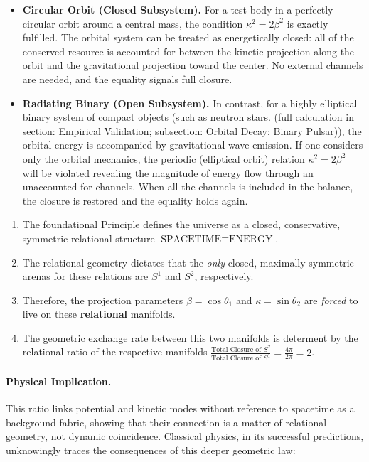 \documentclass[12pt, a4paper]{article}
\begin{document}
\begin{itemize}
    \item \textbf{Circular Orbit (Closed Subsystem).}  
    For a test body in a perfectly circular orbit around a central mass, the condition $\kappa^2 = 2\beta^2$ is exactly fulfilled. The orbital system can be treated as energetically closed: all of the conserved resource is accounted for between the kinetic projection along the orbit and the gravitational projection toward the center. No external channels are needed, and the equality signals full closure.

    \item \textbf{Radiating Binary (Open Subsystem).}  
    In contrast, for a highly elliptical binary system of compact objects (such as neutron stars. (full calculation in section: Empirical Validation; subsection: Orbital Decay: Binary Pulsar)), the orbital energy is accompanied by gravitational-wave emission. If one considers only the orbital mechanics, the periodic  (elliptical orbit)  relation $\kappa^2 = 2\beta^2$ will be violated revealing the magnitude of energy flow through an unaccounted-for channels. When all the channels is included in the balance, the closure is restored and the equality holds again.
\end{itemize}


\begin{tcolorbox}[colback=gray!5, colframe=black!80!black, title=Summary]
\begin{enumerate}
    \item The foundational Principle defines the universe as a closed, conservative, symmetric relational structure $\text{SPACETIME} \equiv \text{ENERGY}$.
    \item The relational geometry dictates that the \textit{only} closed, maximally symmetric arenas for these relations are \(S^1\) and \(S^2\), respectively.
    \item Therefore, the projection parameters $\beta=\cos\theta_1$ and  $\kappa=\sin\theta_2$ are \textit{forced} to live on these \textbf{relational} manifolds.
    \item The geometric exchange rate between this two manifolds is determent by the relational ratio of the respective manifolds $\frac{\text{Total Closure of $S^2$}}{\text{Total Closure of $S^1$}} = \frac{4\pi}{2\pi} = 2$.
\end{enumerate}
\end{tcolorbox}


\paragraph{Physical Implication.}
This ratio links potential and kinetic modes without reference to spacetime as a background fabric, showing that their connection is a matter of  relational geometry, not dynamic coincidence. Classical physics, in its successful predictions, unknowingly traces the consequences of this deeper geometric law:
\end{document}
